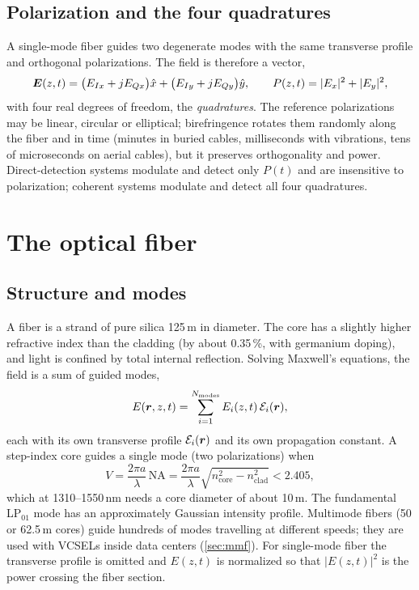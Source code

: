\subsection{Polarization and the four quadratures}
A single-mode fiber guides two degenerate modes with the same transverse profile and orthogonal
polarizations. The field is therefore a vector,
\begin{equation}
  \bm{E}(z,t)=\big(E_{Ix}+jE_{Qx}\big)\hat x+\big(E_{Iy}+jE_{Qy}\big)\hat y,
  \qquad P(z,t)=|E_x|^2+|E_y|^2,
\end{equation}
with four real degrees of freedom, the \emph{quadratures}. The reference polarizations may be
linear, circular or elliptical; birefringence rotates them randomly along the fiber and in time
(minutes in buried cables, milliseconds with vibrations, tens of microseconds on aerial cables),
but it preserves orthogonality and power. Direct-detection systems modulate and detect only
$P(t)$ and are insensitive to polarization; coherent systems modulate and detect all four
quadratures.

\section{The optical fiber}\label{sec:fiber}
\subsection{Structure and modes}
A fiber is a strand of pure silica 125\,\textmu m in diameter. The core has a slightly higher
refractive index than the cladding (by about 0.35\,\%, with germanium doping), and light is
confined by total internal reflection. Solving Maxwell's equations, the field is a sum of guided
modes,
\begin{equation}
  E(\bm{r},z,t)=\sum_{i=1}^{N_{\mathrm{modes}}}E_i(z,t)\,\mathcal E_i(\bm{r}),
\end{equation}
each with its own transverse profile $\mathcal E_i(\bm{r})$ and its own propagation constant. A
step-index core guides a single mode (two polarizations) when
\begin{equation}
  V=\frac{2\pi a}{\lambda}\,\mathrm{NA}=\frac{2\pi a}{\lambda}\sqrt{n_{\mathrm{core}}^2-n_{\mathrm{clad}}^2}<2.405,
\end{equation}
which at 1310--1550\,nm needs a core diameter of about 10\,\textmu m. The fundamental LP$_{01}$ mode
has an approximately Gaussian intensity profile. Multimode fibers (50 or 62.5\,\textmu m cores) guide
hundreds of modes travelling at different speeds; they are used with VCSELs inside data
centers (\cref{sec:mmf}). For single-mode fiber the transverse profile is omitted and $E(z,t)$ is
normalized so that $|E(z,t)|^2$ is the power crossing the fiber section.

